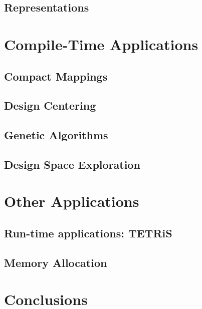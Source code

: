 \documentclass{report}
\begin{document}
\section{Representations}
%

\chapter{Compile-Time Applications}
\label{chap:mapping_applications}

\section{Compact Mappings}
\section{Design Centering}
\section{Genetic Algorithms}
\section{Design Space Exploration}

\chapter{Other Applications}

\section{Run-time applications: TETRiS}
\section{Memory Allocation}

\chapter{Conclusions}

\end{document}
